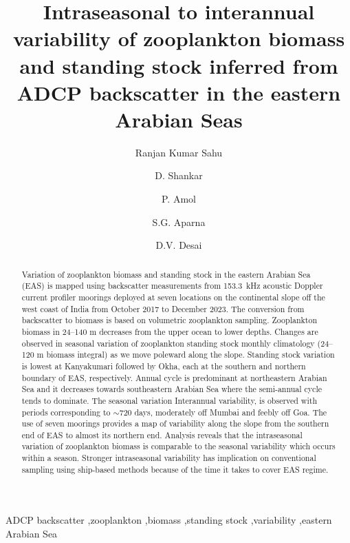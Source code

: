 \documentclass[authoryear,review,11pt]{elsarticle}
\begin{document}
\begin{frontmatter}

\title{Intraseasonal to interannual variability of zooplankton biomass and standing   stock inferred from ADCP backscatter in the eastern Arabian Seas}



\author[1,2]{Ranjan Kumar Sahu}

\author[1,2]{D. Shankar}

\author[2,3]{P. Amol}
\author[1,2]{S.G. Aparna}
\author[1,2]{D.V. Desai}


\address[1]{CSIR-National Institute of Oceanography,Dona Paula,403004,Goa,India}

\address[2]{Academy of Scientific and Innovative Research (AcSIR), 
	Ghaziabad,
	201002,
	Uttar~Pradesh,
	India}

\address[3]{CSIR-NIO, Regional Centre, Visakhapatnam, 530017, Andhra Pradesh, India}



\begin{abstract}
	Variation of zooplankton biomass and standing stock in the eastern Arabian Sea (EAS) is mapped using backscatter measurements from 153.3~kHz acoustic Doppler current profiler moorings deployed at seven locations on the continental slope off the west coast of India from October 2017 to December 2023. The conversion from backscatter to biomass is based on volumetric zooplankton sampling. Zooplankton biomass in 24--140 m decreases from the upper ocean to lower depths. Changes are observed in seasonal variation of zooplankton standing stock monthly climatology (24--120 m biomass  integral) as we move poleward along the slope.  Standing stock variation is lowest at Kanyakumari followed by Okha, each at the southern and northern boundary of EAS, respectively. Annual cycle is predominant at northeastern Arabian Sea and it decreases towards southeastern Arabian Sea where the semi-annual cycle tends to dominate. The seasonal variation  Interannual variability, is observed with periods corresponding to $\sim$720 days, moderately off Mumbai and feebly off Goa. The use of seven moorings provides a map of variability along the slope from the southern end of EAS to almost its northern end.  Analysis reveals that the intraseasonal variation of zooplankton biomass is comparable to the seasonal variability which occurs within a season.	Stronger intraseasonal variability has implication on conventional sampling using ship-based methods because of the time it takes to cover EAS regime.
	
\end{abstract}

\begin{keyword}
	ADCP backscatter \sep zooplankton \sep biomass \sep standing stock \sep variability \sep eastern Arabian Sea
\end{keyword}
\end{frontmatter}
\end{document}
